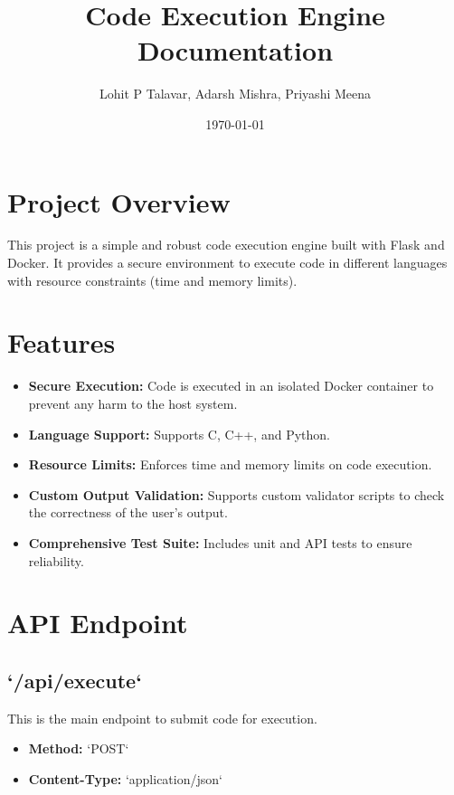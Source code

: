 \documentclass{article}
\title{Code Execution Engine Documentation}
\author{Lohit P Talavar, Adarsh Mishra, Priyashi Meena}
\date{\today}
\begin{document}
\maketitle

\section*{Project Overview}
This project is a simple and robust code execution engine built with Flask and Docker. It provides a secure environment to execute code in different languages with resource constraints (time and memory limits).

\section*{Features}
\begin{itemize}
    \item \textbf{Secure Execution:} Code is executed in an isolated Docker container to prevent any harm to the host system.
    \item \textbf{Language Support:} Supports C, C++, and Python.
    \item \textbf{Resource Limits:} Enforces time and memory limits on code execution.
    \item \textbf{Custom Output Validation:} Supports custom validator scripts to check the correctness of the user's output.
    \item \textbf{Comprehensive Test Suite:} Includes unit and API tests to ensure reliability.
\end{itemize}

\section*{API Endpoint}

\subsection*{`/api/execute`}
This is the main endpoint to submit code for execution.
\begin{itemize}
    \item \textbf{Method:} `POST`
    \item \textbf{Content-Type:} `application/json`
\end{itemize}
\end{document}
